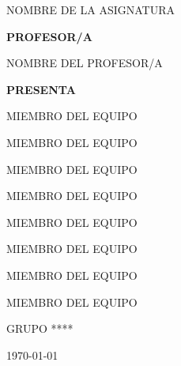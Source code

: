 \documentclass[12pt,a4paper]{article}                           %
\begin{document}
\begin{titlepage}
    \vspace{0.3cm}                                                  %
    {\large NOMBRE DE LA ASIGNATURA \par}                           %

    \vfill                                                          %
    {\bfseries\Large PROFESOR/A \par}                               %

    \vspace{0.3cm}                                                  %
    {\large NOMBRE DEL PROFESOR/A \par}                             %

    \vfill                                                          %
    {\bfseries\Large PRESENTA \par}                                 %

    \vspace{0.3cm}                                                  %
    {\large MIEMBRO DEL EQUIPO \par}
    {\large MIEMBRO DEL EQUIPO \par}
    {\large MIEMBRO DEL EQUIPO \par}
    {\large MIEMBRO DEL EQUIPO \par}
    {\large MIEMBRO DEL EQUIPO \par}
    {\large MIEMBRO DEL EQUIPO \par}
    {\large MIEMBRO DEL EQUIPO \par}
    {\large MIEMBRO DEL EQUIPO \par}

    \vfill                                                          %
    {\Large GRUPO **** \par}                                        %

    \vfill                                                          %
    {\Large \today \par}                                            %

\end{titlepage}
\end{document}
